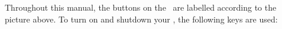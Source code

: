 \begin{center}
\end{center}

Throughout this manual, the buttons on the \dap\ are labelled according to the picture above.
To turn on and shutdown your \dap, the following keys are used:

